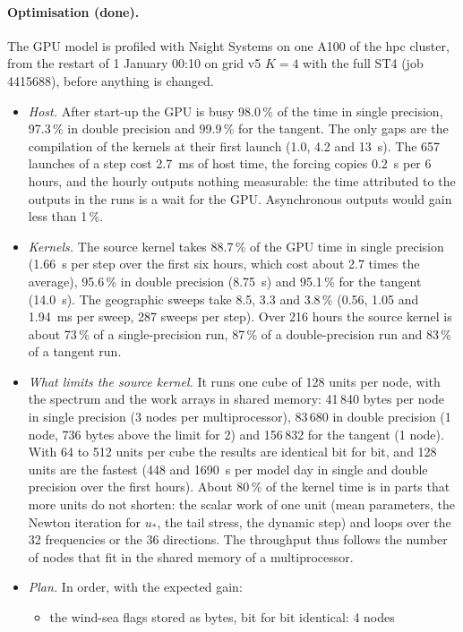 \documentclass[11pt,a4paper]{article}
\begin{document}
\paragraph{Optimisation (done).} The GPU model is profiled with
Nsight Systems on one A100 of the hpc cluster, from the restart of
1 January 00:10 on grid v5 $K=4$ with the full ST4 (job 4415688), before
anything is changed.
\begin{itemize}
\item \emph{Host.} After start-up the GPU is busy 98.0\,\% of the time in
single precision, 97.3\,\% in double precision and 99.9\,\% for the
tangent. The only gaps are the compilation of the kernels at their first
launch (1.0, 4.2 and \SI{13}{s}). The 657 launches of a step cost
\SI{2.7}{ms} of host time, the forcing copies \SI{0.2}{s} per 6 hours,
and the hourly outputs nothing measurable: the time attributed to the
outputs in the runs is a wait for the GPU. Asynchronous outputs would
gain less than 1\,\%.
\item \emph{Kernels.} The source kernel takes 88.7\,\% of the GPU time
in single precision (\SI{1.66}{s} per step over the first six hours,
which cost about 2.7 times the average), 95.6\,\% in double precision
(\SI{8.75}{s}) and 95.1\,\% for the tangent (\SI{14.0}{s}). The
geographic sweeps take 8.5, 3.3 and 3.8\,\% (0.56, 1.05 and
\SI{1.94}{ms} per sweep, 287 sweeps per step). Over 216 hours the source
kernel is about 73\,\% of a single-precision run, 87\,\% of a
double-precision run and 83\,\% of a tangent run.
\item \emph{What limits the source kernel.} It runs one cube of 128 units
per node, with the spectrum and the work arrays in shared memory: 41\,840
bytes per node in single precision (3 nodes per multiprocessor), 83\,680
in double precision (1 node, 736 bytes above the limit for 2) and
156\,832 for the tangent (1 node). With 64 to 512 units per cube the
results are identical bit for bit, and 128 units are the fastest (448
and \SI{1690}{s} per model day in single and double precision over the
first hours). About 80\,\% of the kernel time is in parts that more units
do not shorten: the scalar work of one unit (mean parameters, the Newton
iteration for $u_*$, the tail stress, the dynamic step) and loops over
the 32 frequencies or the 36 directions. The throughput thus follows the
number of nodes that fit in the shared memory of a multiprocessor.
\item \emph{Plan.} In order, with the expected gain:
\begin{itemize}
\item the wind-sea flags stored as bytes, bit for bit identical: 4 nodes

\end{itemize}
\end{itemize}
\end{document}
